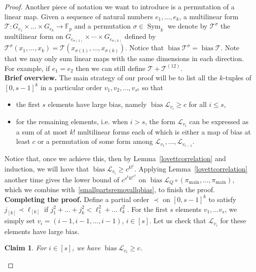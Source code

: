 \documentclass[a4paper,11pt]{article}
\newtheorem{claim}[theorem]{Claim}
\theoremstyle{definition}
\newcommand{\on}[1]{
	\operatorname{#1}
}
\newcommand{\tdt}{\times\cdots\times}
\begin{document}
\begin{proof}
    Another piece of notation we want to introduce is a permutation of a linear map. Given a sequence of natural numbers $e_1, \dots, e_k$, a multilinear form $\mathcal{T}: G_{e_1}\times \ldots \times G_{e_k}\rightarrow \mathbb{F}_p$ and a permutation $\sigma \in \on{Sym}_k$ we denote by $\mathcal{T}^{\sigma}$ the multilinear form on $G_{e_{\sigma(1)}}\tdt G_{e_{\sigma(k)}}$ defined by $\mathcal{T}^{\sigma}(x_1,\ldots, x_k)=\mathcal{T}(x_{\sigma(1)},\ldots ,x_{\sigma(k)})$. Notice that $\on{bias} \mathcal{T}^{\sigma}=\on{bias} \mathcal{T}$. Note that we may only sum linear maps with the same dimensions in each direction. For example, if $e_1 = e_2$ then we can still define $\mathcal{T}+\mathcal{T}^{(12)}$.\\

    \noindent\textbf{Brief overview.} The main strategy of our proof will be to list all the $k$-tuples of $[0,s-1]^k$ in a particular order $v_1, v_2, \ldots, v_{s^k}$ so that
    \begin{itemize}
        \item the first $s$ elements have large bias, namely $\on{bias} \mathcal{L}_{v_i}\ge c$ for all $i\le s$,
        \item for the remaining elements, i.e. when $i > s$, the form $\mathcal{L}_{v_i}$ can be expressed as a sum of at most $k!$ multilinear forms each of which is either a map of bias at least $c$ or a permutation of some form among $\mathcal{L}_{v_{1}}, \dots, \mathcal{L}_{v_{i-1}}$.
    \end{itemize} 
    Notice that, once we achieve this, then by Lemma~\ref{lovettcorrelation} and induction, we will have that $\on{bias} \mathcal{L}_{v_i} \ge c^{k!^i}$. Applying Lemma~\ref{lovettcorrelation} another time gives the lower bound of $c^{s^{k}k!^{s^{k}}}$ on $\on{bias} \mathcal{L}_Q \circ (\pi_{\on{main}}, \dots,\pi_{\on{main}})$, which we combine with~\eqref{smallpartsremovallqbias}, to finish the proof.\\
    
    \noindent\textbf{Completing the proof.} Define a partial order $\prec $ on $[0,s-1]^k$ to satisfy $j_{[k]} \prec \ell_{[k]}$ if $j_1^2+\ldots +j_k^2 < \ell_1^2+\ldots \ell_k^2$. For the first $s$ elements $v_1,\ldots v_s$, we simply set $v_i = (i-1,i-1,\dots,i-1)$, $i \in [s]$. Let us check that $\mathcal{L}_{v_i}$ for these elements have large bias.

    \begin{claim}
        For $i \in [s]$, we have $\on{bias} \mathcal{L}_{v_i} \geq c$. 
    \end{claim}


\end{proof}
\end{document}
